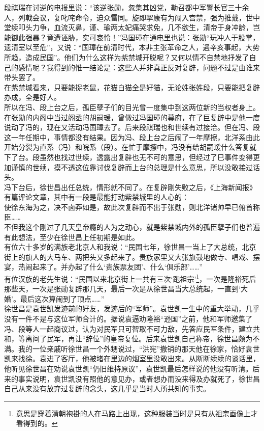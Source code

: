 段祺瑞在讨逆的电报里说：“该逆张勋，忽集其凶党，勒召都中军警长官三十余人，列戟会议，复叱咤命令，迫众雷同。旋即挈康有为闯入宫禁，强为推戴，世中堂续叩头力争，血流灭鼻，谨、瑜两太妃痛哭求免，几不欲生，清帝于身冲龄，岂能御此强暴？竟遭诬胁，实可哀怜！”冯国璋在通电里也说：张勋“玩冲人于股掌，遗清室以至危”，又说：“国璋在前清时代，本非主张革命之人，遇辛亥事起，大势所趋，造成民国”。他们为什么这样为紫禁城开脱呢？又何以情不自禁地抒发了自己的感情呢？我得到的惟一结论是：这些人并非真正反对复辟，问题不过是由谁来带头罢了。\\

在紫禁城看来，只要能捉老鼠，花猫白猫全是好猫，无论姓张姓段，只要能把复辟办成，全是好人。\\

所以在冯、段上台之后，孤臣孽子们的目光曾一度集中到这两位新的当权者身上。在张勋的内阁中当过阁丞的胡嗣瑗，曾做过冯国璋的幕府，在了巨复辟中是他一度说动了冯的，现在又活动冯国璋去了。后来段祺瑞也和世续有过接洽。但在冯、段这一年任期中，事情都没有结果。因为冯、段上台之后闹了一年摩擦，北洋系由此开始分裂为直系（冯）和皖系（段）。在忙于摩擦中，冯没有给胡嗣瑗什么答复就下了台。段虽然也找过世续，透露出复辟也无不可的意思，但经过了巳事件变得更加谨慎的世续，摸不透这位靠讨伐复辟而上台的总理是什么意思，所以没敢接过话头。\\

冯下台后，徐世昌出任总统，情形就不同了。在复辟刚失败之后，《上海新闻报》有篇评论文章，其中有一段是最能打动紫禁城里的人心的：\\

使徐东海为之，决不卤莽如是，故此次复辟而不出于张勋，则北洋诸帅早已俯首称臣……\\

不但我这个刚过了几天皇帝瘾的人为之动心，就是紫禁城内外的孤臣孽子们也普遍有此想法，至少在徐世昌上任初期是如此。\\

有位六十多岁的满族老北京人和我说：“民国七年，徐世昌一当上了大总统，北京街上的旗人的大马车、两把头又多起来了。贵族家里又大张旗鼓地做寺、唱戏、摆宴，热闹起来了。并办起了什么‘贵族票友团’、什么‘俱乐部’……”\\

有位汉族的老先生说：“民国以来北京街上一共有三次‘跑祖宗’\footnote{意思是穿着清朝袍褂的人在马路上出现，这种服装当时是只有从祖宗画像上才看得到的。}，一次是隆裕死后那些天，一次是张勋复辟那几天，最后一次是从徐世昌当大总统起，一直到‘大婚’。最后这次算闹到了顶点……”\\

徐世昌是袁世凯发迹前的好友，发迹后的“军师”。袁世凯一生中的重大举动，几乎没有一件不是与这位军师合计的。据说袁逼劝隆裕“逊国”之前，他和军师邀集了冯、段等人一起商议过，认为对民军只可智取不可力敌，先答应民军条件，建立共和，等离间了民军，再让“辞位”的皇帝复位。后来袁世凯自己称帝，徐世昌颇为不满。我的一位亲戚听徐世昌一个外甥说过，“洪宪”撤销的那天他在徐家，恰好袁世凯来找徐。袁进了客厅，他被堵在里边的烟室里没敢出来。从断断续续的谈话里，他听见徐世昌在劝说袁世凯“仍旧维持原议”，袁世凯最后怎样说的他没有听清。后来的事实说明，袁世凯没有照他的意见办，或者想办而没来得及办就死了，徐世昌自己从来没有放弃过复辟的念头，这几乎是当时人所共知的事实。\\

